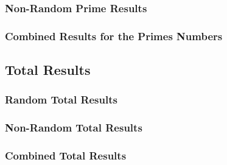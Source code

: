 \subsubsection{Non-Random Prime Results}


\subsubsection{Combined Results for the Primes Numbers} 



\subsection{Total Results}
\subsubsection{Random Total Results}


\subsubsection{Non-Random Total Results}


\subsubsection{Combined Total Results}

